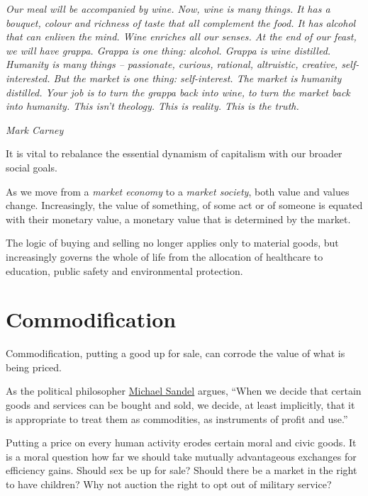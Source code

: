 \documentclass[
]{book}
\begin{document}
\emph{Our meal will be accompanied by wine. Now, wine is many things. It has a bouquet, colour and richness of taste that all complement the food. It has alcohol that can enliven the mind. Wine enriches all our senses.
At the end of our feast, we will have grappa. Grappa is one thing: alcohol. Grappa is wine distilled.
Humanity is many things -- passionate, curious, rational, altruistic, creative, self-interested. But the market is one thing: self-interest. The market is humanity distilled.
Your job is to turn the grappa back into wine, to turn the market back into humanity. This isn't theology. This is reality. This is the truth.}

\emph{Mark Carney}

It is vital to rebalance the essential dynamism of capitalism
with our broader social goals.

As we move from a \emph{market economy} to a \emph{market society},
both value and values change.
Increasingly, the value of something, of some act or of someone
is equated with their monetary value,
a monetary value that is determined by the market.

The logic of buying and selling no longer applies only to material goods, but increasingly governs the whole of life from the allocation of healthcare to education, public safety and environmental protection.

\hypertarget{commodification}{%
\section{Commodification}\label{commodification}}

Commodification, putting a good up for sale,
can corrode the value of what is being priced.

As the political philosopher
\href{https://www.theguardian.com/books/2020/sep/06/michael-sandel-the-populist-backlash-has-been-a-revolt-against-the-tyranny-of-merit}{Michael Sandel}
argues, ``When we decide that certain goods and services can be bought and sold, we decide, at least implicitly, that it is appropriate to treat them as commodities, as instruments of profit and use.''

Putting a price on every human activity erodes certain moral and civic goods. It is a moral question how far we should take mutually advantageous exchanges for efficiency gains. Should sex be up for sale? Should there be a market in the right to have children? Why not auction the right to opt out of military service?
\end{document}
